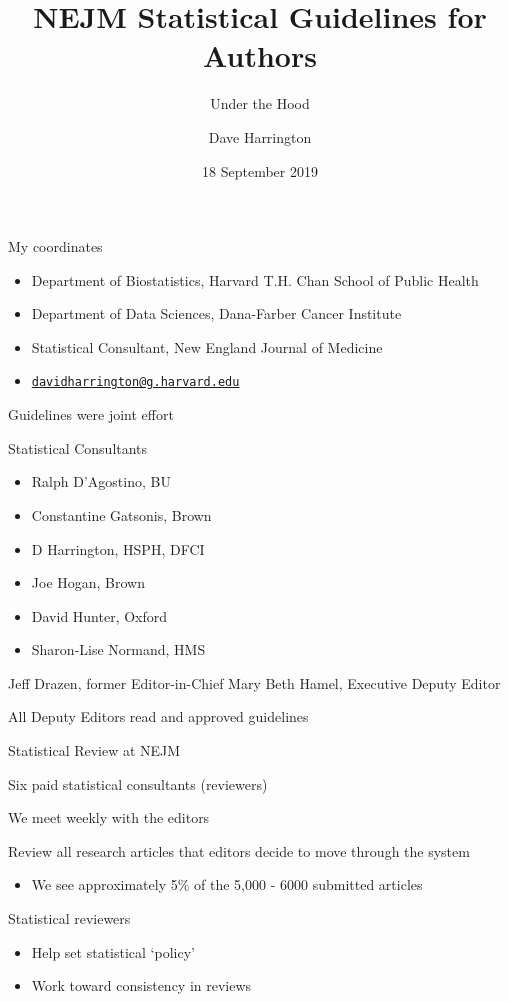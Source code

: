 \documentclass[ignorenonframetext,]{beamer}
\title{NEJM Statistical Guidelines for Authors}
\subtitle{Under the Hood}
\author{Dave Harrington}
\date{18 September 2019}
\providecommand{\tightlist}{%
  \setlength{\itemsep}{0pt}\setlength{\parskip}{0pt}}
\begin{document}
\frame{\titlepage}

\begin{frame}{My coordinates}
\protect\hypertarget{my-coordinates}{}

\begin{itemize}
\item
  Department of Biostatistics, Harvard T.H. Chan School of Public Health
\item
  Department of Data Sciences, Dana-Farber Cancer Institute
\item
  Statistical Consultant, New England Journal of Medicine
\item
  \href{mailto:davidharrington@g.harvard.edu}{\nolinkurl{davidharrington@g.harvard.edu}}
\end{itemize}

\end{frame}

\begin{frame}{Guidelines were joint effort}
\protect\hypertarget{guidelines-were-joint-effort}{}

Statistical Consultants

\begin{itemize}
\tightlist
\item
  Ralph D'Agostino, BU\\
\item
  Constantine Gatsonis, Brown\\
\item
  D Harrington, HSPH, DFCI
\item
  Joe Hogan, Brown
\item
  David Hunter, Oxford\\
\item
  Sharon-Lise Normand, HMS
\end{itemize}

Jeff Drazen, former Editor-in-Chief Mary Beth Hamel, Executive Deputy
Editor

All Deputy Editors read and approved guidelines

\end{frame}

\begin{frame}{Statistical Review at NEJM}
\protect\hypertarget{statistical-review-at-nejm}{}

Six paid statistical consultants (reviewers)

We meet weekly with the editors

Review all research articles that editors decide to move through the
system

\begin{itemize}
\tightlist
\item
  We see approximately 5\% of the 5,000 - 6000 submitted articles
\end{itemize}

Statistical reviewers

\begin{itemize}
\item
  Help set statistical `policy'
\item
  Work toward consistency in reviews
\end{itemize}

\end{frame}
\end{document}
